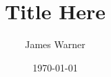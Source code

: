 \documentclass[11pt]{report}
\begin{document}
\title{Title Here}
\author{James Warner}
\date{\mydate\today}
\maketitle
\end{document}
